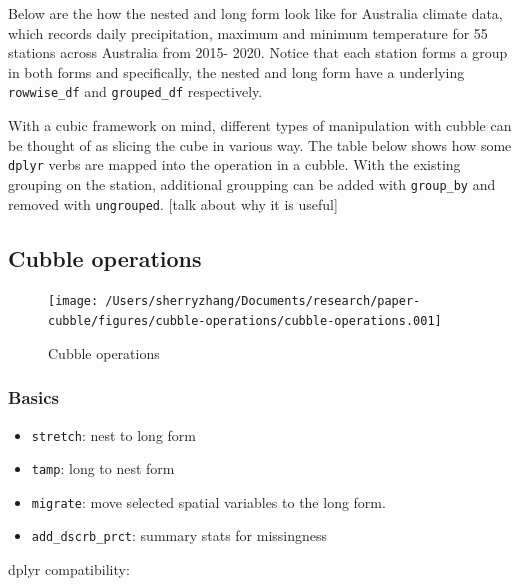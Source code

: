 \documentclass[
]{jss}
\providecommand{\tightlist}{%
  \setlength{\itemsep}{0pt}\setlength{\parskip}{0pt}}
\begin{document}
Below are the how the nested and long form look like for Australia
climate data, which records daily precipitation, maximum and minimum
temperature for 55 stations across Australia from 2015- 2020. Notice
that each station forms a group in both forms and specifically, the
nested and long form have a underlying \texttt{rowwise\_df} and
\texttt{grouped\_df} respectively.

With a cubic framework on mind, different types of manipulation with
cubble can be thought of as slicing the cube in various way. The table
below shows how some \texttt{dplyr} verbs are mapped into the operation
in a cubble. With the existing grouping on the station, additional
groupping can be added with \texttt{group\_by} and removed with
\texttt{ungrouped}. {[}talk about why it is useful{]}

\newpage

\hypertarget{cubble-operations}{%
\subsection{Cubble operations}\label{cubble-operations}}

\begin{CodeChunk}
\begin{figure}

{\centering \texttt{[image: /Users/sherryzhang/Documents/research/paper-cubble/figures/cubble-operations/cubble-operations.001]} 

}

\caption[Cubble operations]{Cubble operations}\label{fig:cubble-operations}
\end{figure}
\end{CodeChunk}

\hypertarget{basics}{%
\subsubsection{Basics}\label{basics}}

\begin{itemize}
\tightlist
\item
  \texttt{stretch}: nest to long form
\item
  \texttt{tamp}: long to nest form
\item
  \texttt{migrate}: move selected spatial variables to the long form.
\item
  \texttt{add\_dscrb\_prct}: summary stats for missingness
\end{itemize}

dplyr compatibility:
\end{document}
